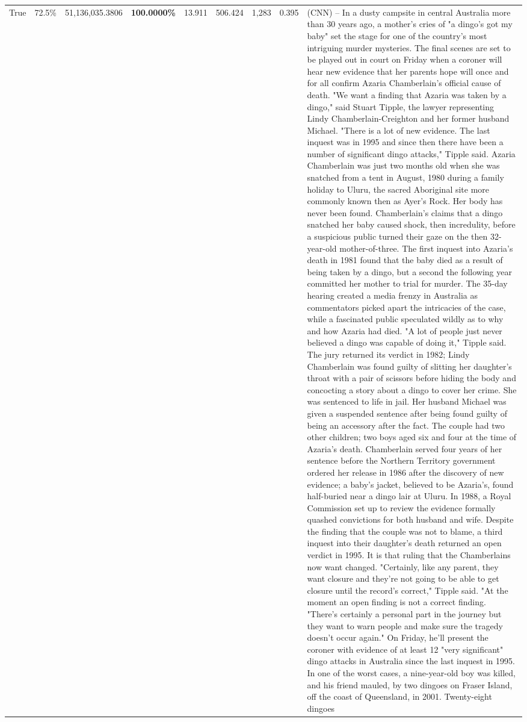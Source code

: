 \begin{table}[H]
\begin{tabular}{lllrlllll}
True & 72.5\% & 51,136,035.3806 & \bfseries \color{red} 100.0000\% & 13.911 & 506.424 & 1,283 & 0.395 & (CNN) -- In a dusty campsite in central Australia more than 30 years ago, a mother's cries of "a dingo's got my baby" set the stage for one of the country's most intriguing murder mysteries. The final scenes are set to be played out in court on Friday when a coroner will hear new evidence that her parents hope will once and for all confirm Azaria Chamberlain's official cause of death. "We want a finding that Azaria was taken by a dingo," said Stuart Tipple, the lawyer representing Lindy Chamberlain-Creighton and her former husband Michael. "There is a lot of new evidence. The last inquest was in 1995 and since then there have been a number of significant dingo attacks," Tipple said. Azaria Chamberlain was just two months old when she was snatched from a tent in August, 1980 during a family holiday to Uluru, the sacred Aboriginal site more commonly known then as Ayer's Rock. Her body has never been found. Chamberlain's claims that a dingo snatched her baby caused shock, then incredulity, before a suspicious public turned their gaze on the then 32-year-old mother-of-three. The first inquest into Azaria's death in 1981 found that the baby died as a result of being taken by a dingo, but a second the following year committed her mother to trial for murder. The 35-day hearing created a media frenzy in Australia as commentators picked apart the intricacies of the case, while a fascinated public speculated wildly as to why and how Azaria had died. "A lot of people just never believed a dingo was capable of doing it," Tipple said. The jury returned its verdict in 1982; Lindy Chamberlain was found guilty of slitting her daughter's throat with a pair of scissors before hiding the body and concocting a story about a dingo to cover her crime. She was sentenced to life in jail. Her husband Michael was given a suspended sentence after being found guilty of being an accessory after the fact. The couple had two other children; two boys aged six and four at the time of Azaria's death. Chamberlain served four years of her sentence before the Northern Territory government ordered her release in 1986 after the discovery of new evidence; a baby's jacket, believed to be Azaria's, found half-buried near a dingo lair at Uluru. In 1988, a Royal Commission set up to review the evidence formally quashed convictions for both husband and wife. Despite the finding that the couple was not to blame, a third inquest into their daughter's death returned an open verdict in 1995. It is that ruling that the Chamberlains now want changed. "Certainly, like any parent, they want closure and they're not going to be able to get closure until the record's correct," Tipple said. "At the moment an open finding is not a correct finding. "There's certainly a personal part in the journey but they want to warn people and make sure the tragedy doesn't occur again." On Friday, he'll present the coroner with evidence of at least 12 "very significant" dingo attacks in Australia since the last inquest in 1995. In one of the worst cases, a nine-year-old boy was killed, and his friend mauled, by two dingoes on Fraser Island, off the coast of Queensland, in 2001. Twenty-eight dingoes 
\end{tabular}
\end{table}
